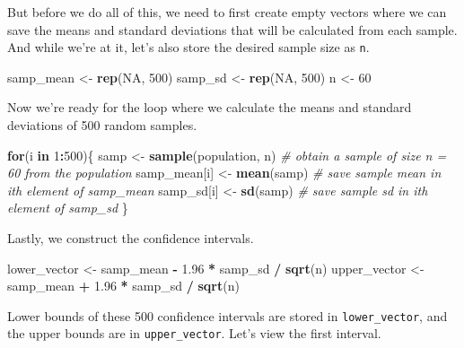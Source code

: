 \documentclass[]{book}
\newenvironment{Shaded}{\begin{snugshade}}{\end{snugshade}}
\newcommand{\CommentTok}[1]{\textcolor[rgb]{0.56,0.35,0.01}{\textit{#1}}}
\newcommand{\ControlFlowTok}[1]{\textcolor[rgb]{0.13,0.29,0.53}{\textbf{#1}}}
\newcommand{\DecValTok}[1]{\textcolor[rgb]{0.00,0.00,0.81}{#1}}
\newcommand{\FloatTok}[1]{\textcolor[rgb]{0.00,0.00,0.81}{#1}}
\newcommand{\KeywordTok}[1]{\textcolor[rgb]{0.13,0.29,0.53}{\textbf{#1}}}
\newcommand{\NormalTok}[1]{#1}
\newcommand{\OperatorTok}[1]{\textcolor[rgb]{0.81,0.36,0.00}{\textbf{#1}}}
\newcommand{\OtherTok}[1]{\textcolor[rgb]{0.56,0.35,0.01}{#1}}
\newcommand{\StringTok}[1]{\textcolor[rgb]{0.31,0.60,0.02}{#1}}
\theoremstyle{definition}
\theoremstyle{definition}
\theoremstyle{definition}
\theoremstyle{remark}
\begin{document}
But before we do all of this, we need to first create empty vectors
where we can save the means and standard deviations that will be
calculated from each sample. And while we're at it, let's also store the
desired sample size as \texttt{n}.

\begin{Shaded}
\begin{Highlighting}[]
\NormalTok{samp_mean <-}\StringTok{ }\KeywordTok{rep}\NormalTok{(}\OtherTok{NA}\NormalTok{, }\DecValTok{500}\NormalTok{)}
\NormalTok{samp_sd <-}\StringTok{ }\KeywordTok{rep}\NormalTok{(}\OtherTok{NA}\NormalTok{, }\DecValTok{500}\NormalTok{)}
\NormalTok{n <-}\StringTok{ }\DecValTok{60}
\end{Highlighting}
\end{Shaded}

Now we're ready for the loop where we calculate the means and standard
deviations of 500 random samples.

\begin{Shaded}
\begin{Highlighting}[]
\ControlFlowTok{for}\NormalTok{(i }\ControlFlowTok{in} \DecValTok{1}\OperatorTok{:}\DecValTok{500}\NormalTok{)\{}
\NormalTok{  samp <-}\StringTok{ }\KeywordTok{sample}\NormalTok{(population, n) }\CommentTok{# obtain a sample of size n = 60 from the population}
\NormalTok{  samp_mean[i] <-}\StringTok{ }\KeywordTok{mean}\NormalTok{(samp)    }\CommentTok{# save sample mean in ith element of samp_mean}
\NormalTok{  samp_sd[i] <-}\StringTok{ }\KeywordTok{sd}\NormalTok{(samp)        }\CommentTok{# save sample sd in ith element of samp_sd}
\NormalTok{\}}
\end{Highlighting}
\end{Shaded}

Lastly, we construct the confidence intervals.

\begin{Shaded}
\begin{Highlighting}[]
\NormalTok{lower_vector <-}\StringTok{ }\NormalTok{samp_mean }\OperatorTok{-}\StringTok{ }\FloatTok{1.96} \OperatorTok{*}\StringTok{ }\NormalTok{samp_sd }\OperatorTok{/}\StringTok{ }\KeywordTok{sqrt}\NormalTok{(n)}
\NormalTok{upper_vector <-}\StringTok{ }\NormalTok{samp_mean }\OperatorTok{+}\StringTok{ }\FloatTok{1.96} \OperatorTok{*}\StringTok{ }\NormalTok{samp_sd }\OperatorTok{/}\StringTok{ }\KeywordTok{sqrt}\NormalTok{(n)}
\end{Highlighting}
\end{Shaded}

Lower bounds of these 500 confidence intervals are stored in
\texttt{lower\_vector}, and the upper bounds are in
\texttt{upper\_vector}. Let's view the first interval.
\end{document}
